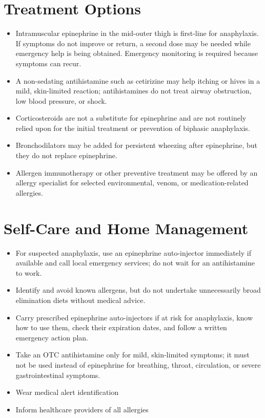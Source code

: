 \section*{Treatment Options}
\begin{itemize}
\item Intramuscular epinephrine in the mid-outer thigh is first-line for anaphylaxis. If symptoms do not improve or return, a second dose may be needed while emergency help is being obtained. Emergency monitoring is required because symptoms can recur.
\item A non-sedating antihistamine such as cetirizine may help itching or hives in a mild, skin-limited reaction; antihistamines do not treat airway obstruction, low blood pressure, or shock.
\item Corticosteroids are not a substitute for epinephrine and are not routinely relied upon for the initial treatment or prevention of biphasic anaphylaxis.
\item Bronchodilators may be added for persistent wheezing after epinephrine, but they do not replace epinephrine.
\item Allergen immunotherapy or other preventive treatment may be offered by an allergy specialist for selected environmental, venom, or medication-related allergies.
\end{itemize}

\section*{Self-Care and Home Management}
\begin{itemize}
\item For suspected anaphylaxis, use an epinephrine auto-injector immediately if available and call local emergency services; do not wait for an antihistamine to work.
\item Identify and avoid known allergens, but do not undertake unnecessarily broad elimination diets without medical advice.
\item Carry prescribed epinephrine auto-injectors if at risk for anaphylaxis, know how to use them, check their expiration dates, and follow a written emergency action plan.
\item Take an OTC antihistamine only for mild, skin-limited symptoms; it must not be used instead of epinephrine for breathing, throat, circulation, or severe gastrointestinal symptoms.
\item Wear medical alert identification
\item Inform healthcare providers of all allergies
\end{itemize}

